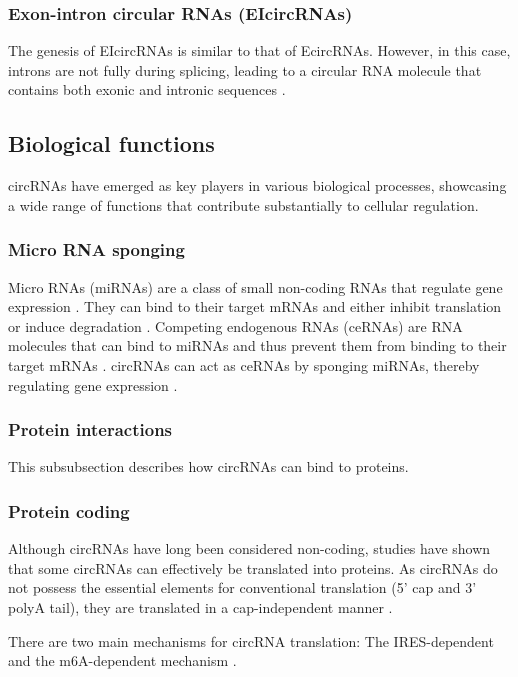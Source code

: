 \subsubsection{Exon-intron circular RNAs (EIcircRNAs)}
The genesis of EIcircRNAs is similar to that of EcircRNAs. However, in this
case, introns are not fully during splicing, leading to a circular RNA molecule
that contains both exonic and intronic sequences \supercite{xiao_circular_2022}.

\subsection{Biological functions}
circRNAs have emerged as key players in various biological processes, showcasing
a wide range of functions that contribute substantially to cellular regulation.

\subsubsection{Micro RNA sponging}
Micro RNAs (miRNAs) are a class of small non-coding RNAs that regulate gene
expression \supercite{bartel_micrornas_2009}. They can bind to their target
mRNAs and either inhibit translation or induce degradation
\supercite{bartel_micrornas_2009}. Competing endogenous RNAs (ceRNAs) are RNA
molecules that can bind to miRNAs and thus prevent them from binding to their
target mRNAs \supercite{tay_multilayered_2014}. circRNAs can act as ceRNAs by
sponging miRNAs, thereby regulating gene expression
\supercite{xiao_circular_2022}.

\subsubsection{Protein interactions}
This subsubsection describes how circRNAs can bind to proteins.

\subsubsection{Protein coding}
Although circRNAs have long been considered non-coding, studies have shown that
some circRNAs can effectively be translated into proteins. As circRNAs do not
possess the essential elements for conventional translation (5' cap and 3' polyA
tail), they are translated in a cap-independent manner
\supercite{chen_expanding_2020}.

There are two main mechanisms for circRNA translation: The IRES-dependent and
the m6A-dependent mechanism \supercite{chen_expanding_2020}.

